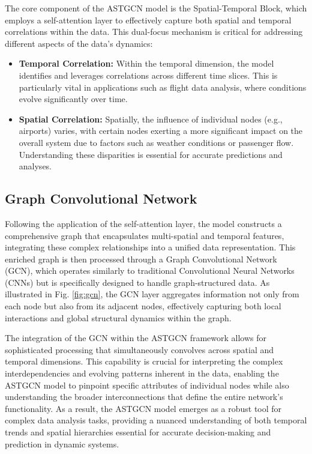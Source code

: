 \documentclass[conference]{IEEEtran}
\begin{document}
The core component of the ASTGCN model is the Spatial-Temporal Block, which employs a self-attention layer to effectively capture both spatial and temporal correlations within the data. This dual-focus mechanism is critical for addressing different aspects of the data's dynamics:
\begin{itemize}

\item \textbf{Temporal Correlation:} Within the temporal dimension, the model identifies and leverages correlations across different time slices. This is particularly vital in applications such as flight data analysis, where conditions evolve significantly over time.

\item \textbf{Spatial Correlation:} Spatially, the influence of individual nodes (e.g., airports) varies, with certain nodes exerting a more significant impact on the overall system due to factors such as weather conditions or passenger flow. Understanding these disparities is essential for accurate predictions and analyses.
\end{itemize}
\subsection{Graph Convolutional Network}


Following the application of the self-attention layer, the model constructs a comprehensive graph that encapsulates multi-spatial and temporal features, integrating these complex relationships into a unified data representation. This enriched graph is then processed through a Graph Convolutional Network (GCN), which operates similarly to traditional Convolutional Neural Networks (CNNs) but is specifically designed to handle graph-structured data. As illustrated in Fig. \ref{fig:gcn}, the GCN layer aggregates information not only from each node but also from its adjacent nodes, effectively capturing both local interactions and global structural dynamics within the graph.

The integration of the GCN within the ASTGCN framework allows for sophisticated processing that simultaneously convolves across spatial and temporal dimensions. This capability is crucial for interpreting the complex interdependencies and evolving patterns inherent in the data, enabling the ASTGCN model to pinpoint specific attributes of individual nodes while also understanding the broader interconnections that define the entire network's functionality. As a result, the ASTGCN model emerges as a robust tool for complex data analysis tasks, providing a nuanced understanding of both temporal trends and spatial hierarchies essential for accurate decision-making and prediction in dynamic systems.
\end{document}
